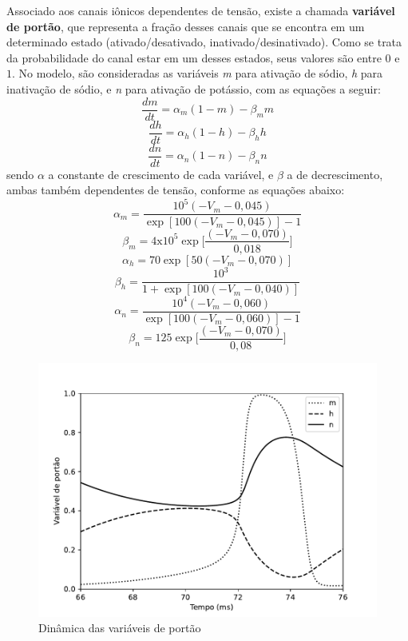 Associado aos canais iônicos dependentes de tensão, existe a chamada \textbf{variável de portão}, que representa a fração desses canais que se encontra em um determinado estado (ativado/desativado, inativado/desinativado). Como se trata da probabilidade do canal estar em um desses estados, seus valores são entre $0$ e $1$. No modelo, são consideradas as variáveis \textit{m} para ativação de sódio, \textit{h} para inativação de sódio, e \textit{n} para ativação de potássio, com as equações a seguir:
\begin{equation}\label{eq:dmdt}
	\frac{dm}{dt}=\alpha_m(1-m)-\beta_mm
\end{equation}
\begin{equation}\label{eq:dhdt}
	\frac{dh}{dt}=\alpha_h(1-h)-\beta_hh
\end{equation}
\begin{equation}\label{eq:dndt}
	\frac{dn}{dt}=\alpha_n(1-n)-\beta_nn
\end{equation}
sendo $\alpha$ a constante de crescimento de cada variável, e $\beta$ a de decrescimento, ambas também dependentes de tensão, conforme as equações abaixo:
\begin{equation}\label{eq:alpha_m}
	\alpha_m=\frac{10^5(-V_m-0,045)}{\exp[100(-V_m-0,045)]-1}
\end{equation}
\begin{equation}\label{eq:beta_m}
	\beta_m=4\text{x}10^5\exp\Big[\frac{(-V_m-0,070)}{0,018}\Big]
\end{equation}
\begin{equation}\label{eq:alpha_h}
	\alpha_h=70\exp[50(-V_m-0,070)]
\end{equation}
\begin{equation}\label{eq:beta_h}
	\beta_h=\frac{10^3}{1+\exp[100(-V_m-0,040)]}
\end{equation}
\begin{equation}\label{eq:alpha_n}
	\alpha_n=\frac{10^4(-V_m-0,060)}{\exp[100(-V_m-0,060)]-1}
\end{equation}
\begin{equation}\label{eq:beta_n}
	\beta_n=125\exp\Big[\frac{(-V_m-0,070)}{0,08}\Big]
\end{equation}
\begin{figure}[tb]
	\centering
	\caption{Dinâmica das variáveis de portão}
	\label{fig:portoes}
	\includegraphics[width=0.7\linewidth]{figs/portoes}
\end{figure}

